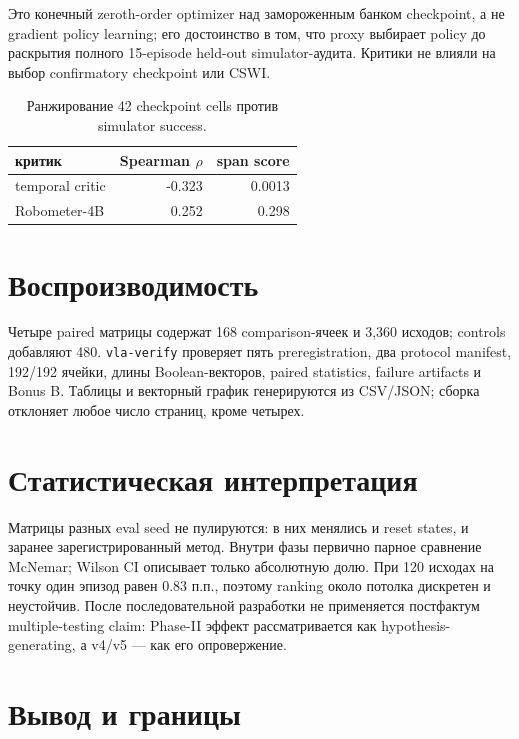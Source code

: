 \documentclass[10pt,twocolumn]{article}
\newcommand{\code}[1]{\texttt{#1}}
\newcommand{\tightcaption}[1]{\caption{#1}\vspace{-3pt}}
\begin{document}
\BonusText

\OptimizationText Это конечный zeroth-order optimizer над замороженным банком checkpoint, а не
gradient policy learning; его достоинство в том, что proxy выбирает policy до раскрытия полного
15-episode held-out simulator-аудита. Критики не влияли на выбор confirmatory checkpoint или CSWI.

\begin{table}[h]
\centering\small
\begin{tabular}{lrr}\toprule
критик & Spearman $\rho$ & span score\\\midrule
temporal critic & -0.323 & 0.0013\\
Robometer-4B & 0.252 & 0.298\\
\bottomrule
\end{tabular}
\tightcaption{Ранжирование 42 checkpoint cells против simulator success.}
\end{table}

\section{Воспроизводимость}

Четыре paired матрицы содержат 168 comparison-ячеек и 3,360 исходов; controls добавляют 480.
\code{vla-verify} проверяет пять preregistration, два protocol manifest, 192/192 ячейки,
длины Boolean-векторов, paired statistics, failure artifacts и Bonus B. Таблицы и векторный график
генерируются из CSV/JSON; сборка отклоняет любое число страниц, кроме четырех.

\section{Статистическая интерпретация}

Матрицы разных eval seed не пулируются: в них менялись и reset states, и заранее зарегистрированный
метод. Внутри фазы первично парное сравнение McNemar; Wilson CI описывает только абсолютную долю.
При 120 исходах на точку один эпизод равен 0.83 п.п., поэтому ranking около потолка дискретен и
неустойчив. После последовательной разработки не применяется постфактум multiple-testing claim:
Phase-II эффект рассматривается как hypothesis-generating, а v4/v5 --- как его опровержение.

\newpage

\section{Вывод и границы}
\end{document}
